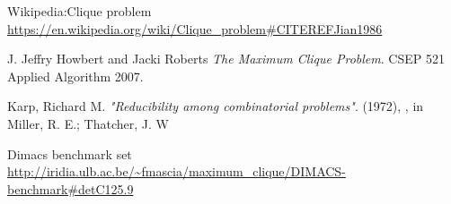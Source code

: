\documentclass{article}
\begin{document}
\begin{thebibliography}{}
Wikipedia:Clique problem
\\\url{https://en.wikipedia.org/wiki/Clique_problem#CITEREFJian1986}


J. Jeffry Howbert and Jacki Roberts 
\textit{The Maximum Clique Problem}. 
CSEP 521 Applied Algorithm 2007.

Karp, Richard M.
\textit{"Reducibility among combinatorial problems"}. 
 (1972), , in Miller, R. E.; Thatcher, J. W
 
 

Dimacs benchmark set
\\\url{http://iridia.ulb.ac.be/~fmascia/maximum_clique/DIMACS-benchmark#detC125.9}




\end{thebibliography}
\end{document}
